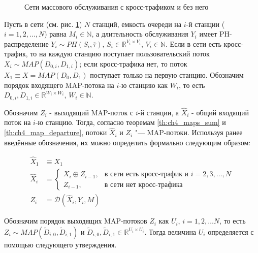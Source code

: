 \begin{figure}[htb]
  \caption{Сети массового обслуживания с кросс-трафиком и без него}
  \label{fig:ch4_queueing_networks}
\end{figure}

Пусть в сети (см. рис. \ref{fig:ch4_queueing_networks}) $N$ станций, емкость очереди на $i$-й станции ($i = 1,2, \dots, N$) равна $M_i \in \mathbb{N}$, а длительность обслуживания $Y_i$ имеет PH-распределение $Y_i \sim PH(S_i, \overline{\tau})$, $S_i \in \mathbb{R}^{V_i \times V_i}$, $V_i \in \mathbb{N}$. Если в сети есть кросс-трафик, то на каждую станцию поступает пользовательский поток $X_i \sim MAP(D_{0,i}, D_{1,i})$; если кросс-трафика нет, то поток $X_1 \equiv X = MAP(D_0, D_1)$ поступает только на первую станцию. Обозначим порядок входящего MAP-потока на $i$-ю станцию как $W_i$, то есть $D_{0,i}, D_{1,i} \in \mathbb{R}^{W_i \times W_i}$, $W_i \in \mathbb{N}$.

Обозначим $Z_i$ - выходящий MAP-поток с $i$-й станции, а $\hat{X}_i$ - общий входящий поток на $i$-ю станцию. Тогда, согласно теоремам \ref{th:ch4_maps_sum} и \ref{th:ch4_map_departure}, потоки $\hat{X}_i$ и $Z_i$ "--- MAP-потоки. Используя ранее введённые обозначения, их можно определить формально следующим образом:

\begin{equation}
  \label{eq:ch4_total_arrival_and_departure}
  \begin{aligned}
    \hat{X}_1 &\equiv X_1\\
    \hat{X}_i &= \begin{cases}
      X_i \oplus Z_{i-1},&\text{в сети есть кросс-трафик и } i = 2,3, \dots, N\\
      Z_{i-1},&\text{в сети нет кросс-трафика}
    \end{cases}\\
    Z_i &= \mathcal{D}(\hat{X}_i, Y_i, M)
  \end{aligned}
\end{equation}

Обозначим порядок выходящих MAP-потоков $Z_i$ как $U_i$, $i=1,2,\dots N$, то есть $Z_i \sim MAP(\tilde{D}_{i,0}, \tilde{D}_{i,1})$ и $\tilde{D}_{i,0}, \tilde{D}_{i,1} \in \mathbb{R}^{U_i \times U_i}$. Тогда величина $U_i$ определяется с помощью следующего утверждения.

